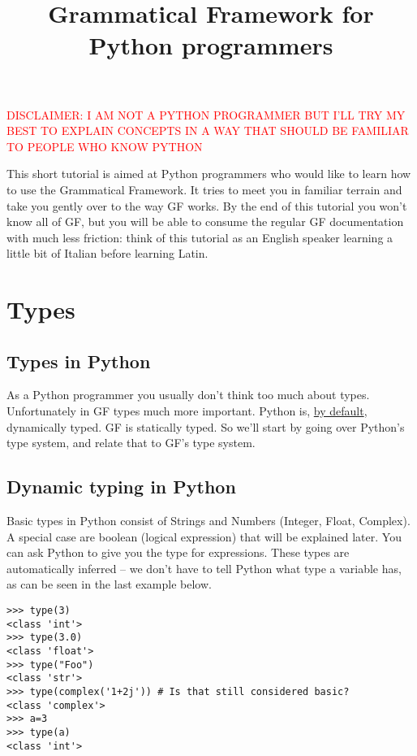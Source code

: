 \documentclass{scrartcl}
\title{Grammatical Framework for Python programmers}
\newcommand{\note}[1]{\textcolor{red}{\uppercase{#1}}}
\begin{document}
\maketitle
\note{disclaimer: i am not a python programmer but i'll try my best to explain concepts in a way that should be familiar to people who know python}

This short tutorial is aimed at Python programmers who would like to learn how to use the Grammatical Framework. It tries to meet you in familiar terrain and take you gently over to the way GF works.
By the end of this tutorial you won't know all of GF, but you will be able to consume the regular GF documentation with much less friction: think of this tutorial as an English speaker learning a little bit of Italian before learning Latin.

\section{Types}


\subsection{Types in Python}

As a Python programmer you usually don't think too much about types. Unfortunately in GF types much more important. Python is, \href{https://medium.com/@ageitgey/learn-how-to-use-static-type-checking-in-python-3-6-in-10-minutes-12c86d72677b}{by default}, dynamically typed. GF is statically typed. So we'll start by going over Python's type system, and relate that to GF's type system.

\subsection{Dynamic typing in Python}

Basic types in Python consist of Strings and Numbers (Integer, Float, Complex). A special case are boolean (logical expression) that will be explained later.
You can ask Python to give you the type for expressions. These types are automatically inferred -- we don't have to tell Python what type
a variable has, as can be seen in the last example below.

\begin{verbatim}
>>> type(3)
<class 'int'>
>>> type(3.0)
<class 'float'>
>>> type("Foo")
<class 'str'>
>>> type(complex('1+2j')) # Is that still considered basic?
<class 'complex'>
>>> a=3
>>> type(a)
<class 'int'>
\end{verbatim}
\end{document}
